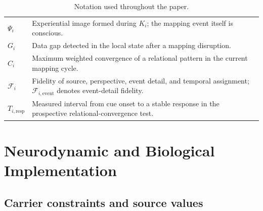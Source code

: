 \begin{table}[H]
\begin{tabular}{p{3.0cm}p{9.8cm}}
$\Psi_i$ & Experiential image formed during $K_i$; the mapping event itself is conscious. \\
$G_i$ & Data gap detected in the local state after a mapping disruption. \\
$C_i$ & Maximum weighted convergence of a relational pattern in the current mapping cycle. \\
$\mathcal F_i$ & Fidelity of source, perspective, event detail, and temporal assignment; $\mathcal F_{i,\mathrm{event}}$ denotes event-detail fidelity. \\
$T_{i,\mathrm{resp}}$ & Measured interval from cue onset to a stable response in the prospective relational-convergence test. \\
\bottomrule
\end{tabular}
\caption{Notation used throughout the paper.}
\label{tab:notation}
\end{table}

\section{Neurodynamic and Biological Implementation}
\label{app:neurodynamic}

\subsection{Carrier constraints and source values}

